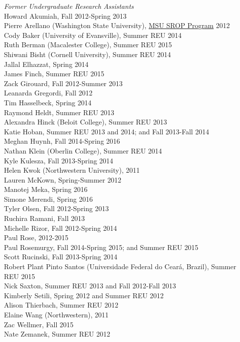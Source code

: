 \documentclass[9pt]{extarticle}
\begin{document}
\emph{Former Undergraduate Research Assistants} \\
Howard Akumiah, Fall 2012-Spring 2013 \\
Pierre Arellano (Washington State University), \href{http://grad.msu.edu/srop/}{MSU SROP Program} 2012 \\
Cody Baker (University of Evansville), Summer REU 2014 \\
Ruth Berman (Macalester College), Summer REU 2015 \\
Shiwani Bisht (Cornell University), Summer REU 2014 \\
Jallal Elhazzat, Spring 2014 \\
James Finch, Summer REU 2015 \\
Zack Girouard, Fall 2012-Summer 2013 \\
Leanarda Gregordi, Fall 2012 \\
Tim Hasselbeck, Spring 2014 \\
Raymond Heldt, Summer REU 2013 \\
Alexandra Hinck (Beloit College), Summer REU 2013 \\
Katie Hoban, Summer REU 2013 and 2014; and Fall 2013-Fall 2014 \\
Meghan Huynh, Fall 2014-Spring 2016 \\
Nathan Klein (Oberlin College), Summer REU 2014 \\
Kyle Kulesza, Fall 2013-Spring 2014 \\
Helen Kwok (Northwestern University), 2011 \\
Lauren McKown, Spring-Summer 2012 \\
Manotej Meka, Spring 2016 \\
Simone Merendi, Spring 2016 \\
Tyler Olsen, Fall 2012-Spring 2013 \\
Ruchira Ramani, Fall 2013 \\
Michelle Rizor, Fall 2012-Spring 2014 \\
Paul Rose, 2012-2015 \\
Paul Rosemurgy, Fall 2014-Spring 2015; and Summer REU 2015 \\
Scott Rucinski, Fall 2013-Spring 2014 \\
Robert Plant Pinto Santos (Universidade Federal do Cear\'{a}, Brazil), Summer REU 2015 \\
Nick Saxton, Summer REU 2013 and Fall 2012-Fall 2013 \\
Kimberly Setili, Spring 2012 and Summer REU 2012 \\
Alison Thierbach, Summer REU 2012 \\
Elaine Wang (Northwestern), 2011 \\
Zac Wellmer, Fall 2015 \\
Nate Zemanek, Summer REU 2012 \\
\end{document}
